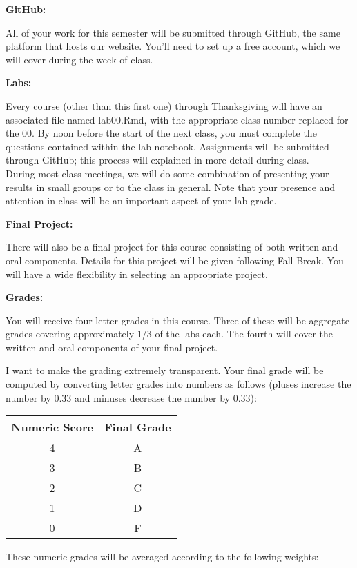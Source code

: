 \documentclass[12pt]{article}
\begin{document}
\vspace{0.4cm}

\textbf{GitHub:} \vspace{6pt}

All of your work for this semester will be submitted through GitHub,
the same platform that hosts our website. You'll need to set up a free
account, which we will cover during the week of class.

\vspace{0.4cm}

\textbf{Labs:} \vspace{6pt}

Every course (other than this first one) through Thanksgiving will
have an associated file named lab00.Rmd, with the appropriate class
number replaced for the 00. By noon before the start of the next
class, you must complete the questions contained within the lab
notebook. Assignments will be submitted through GitHub; this
process will explained in more detail during class. \\

During most class meetings, we will do some combination of presenting
your results in small groups or to the class in general. Note that
your presence and attention in class will be an important aspect
of your lab grade.

\newpage

\textbf{Final Project:} \vspace{6pt}

There will also be a final project for this course consisting of
both written and oral components. Details for this project will be
given following Fall Break. You will have a wide flexibility in
selecting an appropriate project.

\vspace{0.4cm}

\textbf{Grades:} \vspace{6pt}

You will receive four letter grades in this course. Three of
these will be aggregate grades covering approximately 1/3 of the
labs each. The fourth will cover the written and oral components
of your final project.

I want to make the grading extremely transparent. Your final
grade will be computed by converting letter grades into numbers
as follows (pluses increase the number by 0.33 and minuses
decrease the number by 0.33):

\begin{center}
\begin{tabular}{c || c}
Numeric Score & Final Grade \\
\hline \hline
4 & A  \\
3 & B  \\
2 & C  \\
1 & D  \\
0 & F
\end{tabular}
\end{center}
These numeric grades will be averaged according to the following
weights:
\end{document}
